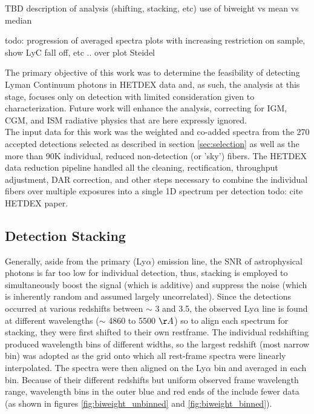 \documentclass{aastex62}
\begin{document}
TBD description of analysis (shifting, stacking, etc) use of biweight vs mean vs median

{ \color{red} todo: progression of averaged spectra plots with increasing restriction on sample, show LyC fall off, etc .. over plot Steidel}

The primary objective of this work was to determine the feasibility of detecting Lyman Continuum photons in HETDEX data and, as such, the analysis at this stage, focuses only on detection with limited consideration given to characterization. Future work will enhance the analysis, correcting for IGM, CGM, and ISM radiative physics that are here expressly ignored.\\

The input data for this work was the weighted and co-added spectra from the 270 accepted detections selected as described in section \ref{sec:selection} as well as the more than 90K individual, reduced non-detection (or 'sky') fibers. The HETDEX data reduction pipeline handled all the cleaning, rectification, throughput adjustment, DAR correction, and other steps necessary to combine the individual fibers over multiple exposures into a single 1D spectrum per detection { \color{red} todo: cite HETDEX paper}.


\subsection{Detection Stacking}

Generally, aside from the primary (Ly$\alpha$) emission line, the SNR of astrophysical photons is far too low for individual detection, thus, stacking is employed to simultaneously boost the signal (which is additive) and suppress the noise (which is inherently random and assumed largely uncorrelated). Since the detections occurred at various redshifts between $\sim$ 3 and 3.5, the observed Ly$\alpha$ line is found at different wavelengths ($\sim$ 4860 to 5500 $\AA$) so to align each spectrum for stacking, they were first shifted to their own restframe. The individual redshifting produced wavelength bins of different widths, so the largest redshift (most narrow bin) was adopted as the grid onto which all rest-frame spectra were linearly interpolated. The spectra were then aligned on the Ly$\alpha$ bin and averaged in each bin. Because of their different redshifts but uniform observed frame wavelength range, wavelength bins in the outer blue and red ends of the include fewer data (as shown in figures \ref{fig:biweight_unbinned} and \ref{fig:biweight_binned}).
\end{document}
